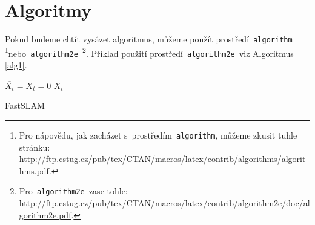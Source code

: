 \documentclass[11pt,a4paper]{article}
\begin{document}
\section{\label{sec3}Algoritmy}
Pokud budeme chtít vysázet algoritmus, můžeme použít prostředí\texttt{ algorithm }\footnote{Pro nápovědu, jak zacházet s~prostředím\texttt{ algorithm}, můžeme zkusit tuhle stránku:\\ \href{http://ftp.cstug.cz/pub/tex/CTAN/macros/latex/contrib/algorithms/algorithms.pdf}{http://ftp.cstug.cz/pub/tex/CTAN/macros/latex/contrib/algorithms/algorithms.pdf}.}nebo\texttt{ algorithm2e }\footnote{Pro\texttt{ algorithm2e }zase tohle: \href{http://ftp.cstug.cz/pub/tex/CTAN/macros/latex/contrib/algorithm2e/doc/algorithm2e.pdf}{http://ftp.cstug.cz/pub/tex/CTAN/macros/latex/contrib/algorithm2e/doc/algorithm2e.pdf}.}. Příklad použití prostředí\texttt{ algorithm2e }viz Algoritmus \ref{alg1}.\\
\bigbreak
\begin{algorithm}[H]
\label{alg1}
\SetNlSty{}{}{:}
\SetNlSkip{-1em}
\Indp
$\overline{X_t} = X_t = 0$\;
  \Return $X_t$
\caption{FastSLAM}
\end{algorithm}
\bigbreak
\end{document}
